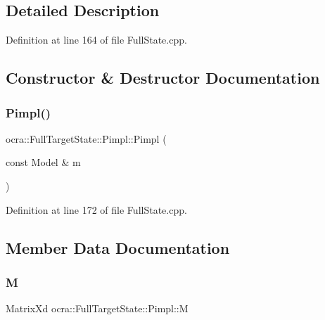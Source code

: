 \subsection{Detailed Description}


Definition at line 164 of file Full\+State.\+cpp.



\subsection{Constructor \& Destructor Documentation}
\hypertarget{structocra_1_1FullTargetState_1_1Pimpl_abf41bdded179528f89726ae9071f1377}{}\label{structocra_1_1FullTargetState_1_1Pimpl_abf41bdded179528f89726ae9071f1377} 
\subsubsection{\texorpdfstring{Pimpl()}{Pimpl()}}
{\footnotesize\ttfamily ocra\+::\+Full\+Target\+State\+::\+Pimpl\+::\+Pimpl (\begin{DoxyParamCaption}\item[{const Model \&}]{m }\end{DoxyParamCaption})\hspace{0.3cm}{\ttfamily [inline]}}



Definition at line 172 of file Full\+State.\+cpp.



\subsection{Member Data Documentation}
\hypertarget{structocra_1_1FullTargetState_1_1Pimpl_aaf42a0f7ecf1e3750695edc06fb06c11}{}\label{structocra_1_1FullTargetState_1_1Pimpl_aaf42a0f7ecf1e3750695edc06fb06c11} 
\subsubsection{\texorpdfstring{M}{M}}
{\footnotesize\ttfamily Matrix\+Xd ocra\+::\+Full\+Target\+State\+::\+Pimpl\+::M}



